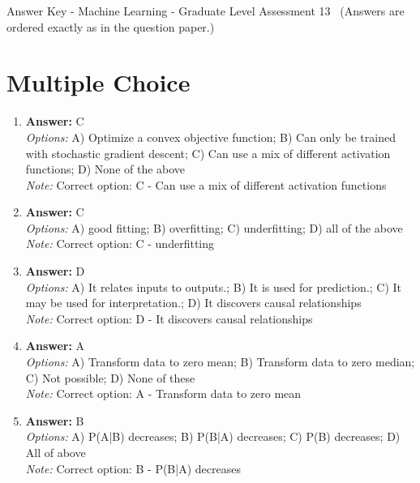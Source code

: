 \documentclass[12pt]{article}
\begin{document}
\begin{center}
Answer Key - Machine Learning - Graduate Level Assessment 13 \
\small (Answers are ordered exactly as in the question paper.)
\end{center}

\section*{Multiple Choice}
\begin{enumerate}[label=\arabic*.]
\item \textbf{Answer:} C
\\ \textit{Options:} A) Optimize a convex objective function; B) Can only be trained with stochastic gradient descent; C) Can use a mix of different activation functions; D) None of the above
\\ \textit{Note:} Correct option: C - Can use a mix of different activation functions
\item \textbf{Answer:} C
\\ \textit{Options:} A) good fitting; B) overfitting; C) underfitting; D) all of the above
\\ \textit{Note:} Correct option: C - underfitting
\item \textbf{Answer:} D
\\ \textit{Options:} A) It relates inputs to outputs.; B) It is used for prediction.; C) It may be used for interpretation.; D) It discovers causal relationships
\\ \textit{Note:} Correct option: D - It discovers causal relationships
\item \textbf{Answer:} A
\\ \textit{Options:} A) Transform data to zero mean; B) Transform data to zero median; C) Not possible; D) None of these
\\ \textit{Note:} Correct option: A - Transform data to zero mean
\item \textbf{Answer:} B
\\ \textit{Options:} A) P(A|B) decreases; B) P(B|A) decreases; C) P(B) decreases; D) All of above
\\ \textit{Note:} Correct option: B - P(B|A) decreases
\end{enumerate}
\end{document}
